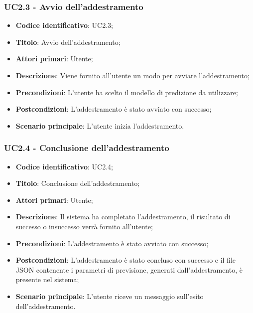 \subsubsection{UC2.3 - Avvio dell'addestramento}
\begin{itemize}
    \item \textbf{Codice identificativo}: UC2.3;
    \item \textbf{Titolo}: Avvio dell'addestramento;
    \item \textbf{Attori primari}: Utente;
    \item \textbf{Descrizione}: Viene fornito all'utente un modo per avviare l'addestramento;
    \item \textbf{Precondizioni}: L'utente ha scelto il modello di predizione da utilizzare;
    \item \textbf{Postcondizioni}: L'addestramento è stato avviato con successo;
    \item \textbf{Scenario principale}: L'utente inizia l'addestramento.
\end{itemize}

\subsubsection{UC2.4 - Conclusione dell'addestramento}
\begin{itemize}
    \item \textbf{Codice identificativo}: UC2.4;
    \item \textbf{Titolo}: Conclusione dell'addestramento;
    \item \textbf{Attori primari}: Utente;
    \item \textbf{Descrizione}: Il sistema ha completato l'addestramento, il risultato di successo o insuccesso verrà fornito all'utente;
    \item \textbf{Precondizioni}: L'addestramento è stato avviato con successo;
    \item \textbf{Postcondizioni}: L'addestramento è stato concluso con successo e il file JSON contenente i parametri di previsione, generati dall'addestramento, è presente nel sistema;
    \item \textbf{Scenario principale}: L'utente riceve un messaggio sull'esito dell'addestramento.
\end{itemize}
